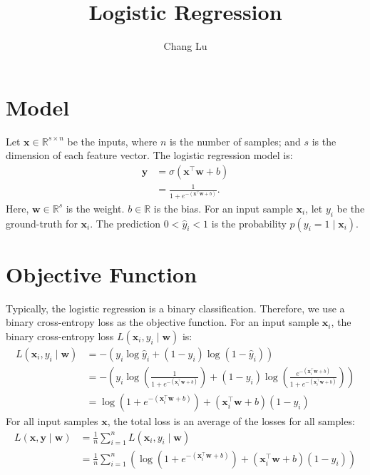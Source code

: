 \documentclass{article}
\title{Logistic Regression}
\author{Chang Lu}
\begin{document}
\maketitle

\section{Model}
Let $\mathbf{x} \in \mathbb{R}^{s \times n}$ be the inputs, where $n$ is the number of samples; and $s$ is the dimension of each feature vector. The logistic regression model is:
\begin{align}
    \hat{\mathbf{y}} &= \sigma\left(\mathbf{x}^\top\mathbf{w} + b\right) \\
    & = \frac{1}{1 + e^{-\left(\mathbf{x^\top w} + b\right)}}.
\end{align}
Here, $\mathbf{w} \in \mathbb{R}^s$ is the weight. $b \in \mathbb{R}$ is the bias. For an input sample $\mathbf{x}_i$, let $y_i$ be the ground-truth for $\mathbf{x}_i$. The prediction $0 < \hat{{y}}_i < 1$ is the probability $p\left(y_i = 1 \mid \mathbf{x}_i\right)$.

\section{Objective Function}
Typically, the logistic regression is a binary classification. Therefore, we use a binary cross-entropy loss as the objective function. For an input sample $\mathbf{x}_i$, the binary cross-entropy loss $L(\mathbf{x}_i, y_i \mid \mathbf{w})$ is:
\begin{align}
    L(\mathbf{x}_i, y_i \mid \mathbf{w}) &= -\left(y_i \log\hat{y}_i + \left(1 - y_i\right)\log\left(1 - \hat{y}_i\right)\right) \\
    &= -\left(y_i \log\left(\frac{1}{1 + e^{-\left(\mathbf{x}^\top_i\mathbf{w} + b\right)}}\right) + \left(1 - y_i\right)\log\left(\frac{e^{-\left(\mathbf{x}^\top_i\mathbf{w} + b\right)}}{1 + e^{-\left(\mathbf{x}^\top_i\mathbf{w} + b\right)}}\right)\right) \\
    &= \log\left(1 + e^{-\left(\mathbf{x}^\top_i\mathbf{w} + b\right)}\right) + \left(\mathbf{x}^\top_i\mathbf{w} + b\right)\left(1 - y_i\right)
\end{align}
For all input samples $\mathbf{x}$, the total loss is an average of the losses for all samples:
\begin{align}
    L(\mathbf{x}, \mathbf{y} \mid \mathbf{w}) &= \frac{1}{n}\sum_{i = 1}^{n}{L(\mathbf{x}_i, y_i \mid \mathbf{w})} \\
    &= \frac{1}{n}\sum_{i = 1}^{n}{\left(\log\left(1 + e^{-\left(\mathbf{x}^\top_i\mathbf{w} + b\right)}\right) + \left(\mathbf{x}^\top_i\mathbf{w} + b\right)\left(1 - y_i\right)\right)}
\end{align}
\end{document}
